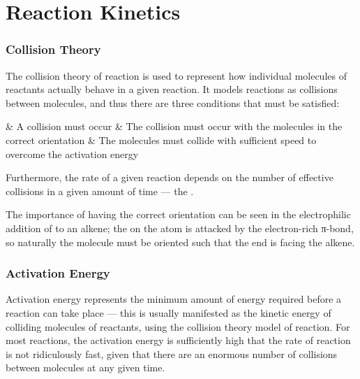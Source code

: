 
\pagebreak
\part{Reaction Kinetics}

	\section{Collision Theory}
		The collision theory of reaction is used to represent how individual molecules of reactants actually behave in a given reaction.
		It models reactions as collisions between molecules, and thus there are three conditions that must be satisfied:

		\begin{bulletlist}
			& A collision must occur
			& The collision must occur with the molecules in the correct orientation
			& The molecules must collide with sufficient speed to overcome the activation energy
		\end{bulletlist}

		Furthermore, the rate of a given reaction depends on the number of effective collisions in a given amount of time --- the
		.

		The importance of having the correct orientation can be seen in the electrophilic addition of  to an alkene; the \deltap{}
		on the  atom is attacked by the electron-rich π-bond, so naturally the  molecule must be oriented such that the 
		end is facing the alkene.




	\section{Activation Energy}

		Activation energy represents the minimum amount of energy required before a reaction can take place --- this is usually manifested as
		the kinetic energy of colliding molecules of reactants, using the collision theory model of reaction. For most reactions, the activation
		energy is sufficiently high that the rate of reaction is not ridiculously fast, given that there are an enormous number of collisions
		between molecules at any given time.


